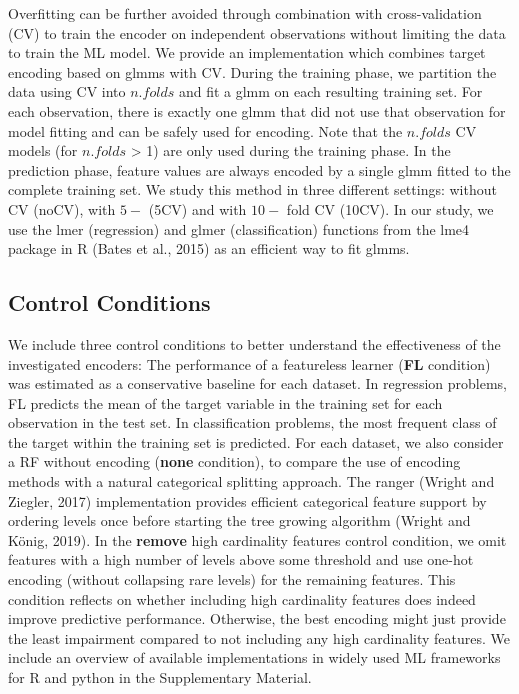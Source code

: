\documentclass[smallextended]{svjour3}       %
\begin{document}
Overfitting can be further avoided through combination with cross-validation (CV) to train the encoder on independent observations without limiting the data to train the ML model.
We provide an implementation which combines target encoding based on glmms with CV.
During the training phase, we partition the data using CV into \(n.folds\) and fit a glmm on each resulting training set.
For each observation, there is exactly one glmm that did not use that observation for model fitting and can be safely used for encoding.
Note that the \(n.folds\) CV models (for \(n.folds\) \textgreater{} 1) are only used during the training phase.
In the prediction phase, feature values are always encoded by a single glmm fitted to the complete training set.
We study this method in three different settings: without CV (noCV), with \(5-\) (5CV) and with \(10-\) fold CV (10CV).
In our study, we use the lmer (regression) and glmer (classification) functions from the lme4 package in R (Bates et al., 2015) as an efficient way to fit glmms.

\hypertarget{control-conditions}{%
\subsection{Control Conditions}\label{control-conditions}}

We include three control conditions to better understand the effectiveness of the investigated encoders:
The performance of a featureless learner (\textbf{FL} condition) was estimated as a conservative baseline for each dataset.
In regression problems, FL predicts the mean of the target variable in the training set for each observation in the test set.
In classification problems, the most frequent class of the target within the training set is predicted.
For each dataset, we also consider a RF without encoding (\textbf{none} condition), to compare the use of encoding methods with a natural categorical splitting approach.
The ranger (Wright and Ziegler, 2017) implementation provides efficient categorical feature support by ordering levels once before starting the tree growing algorithm (Wright and König, 2019).
In the \textbf{remove} high cardinality features control condition, we omit features with a high number of levels above some threshold and use one-hot encoding (without collapsing rare levels) for the remaining features.
This condition reflects on whether including high cardinality features does indeed improve predictive performance.
Otherwise, the best encoding might just provide the least impairment compared to not including any high cardinality features.
We include an overview of available implementations in widely used ML frameworks for R and python in the Supplementary Material.
\end{document}
